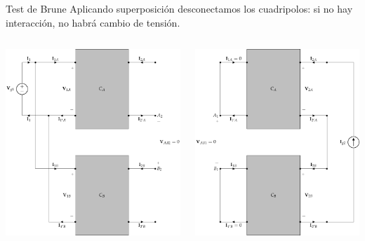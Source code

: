 \documentclass[xcolor={usenames,svgnames,dvipsnames}]{beamer}
\begin{document}
\begin{frame}[label={sec:org75273b2},plain]{Test de Brune}
Aplicando superposición desconectamos los cuadripolos: \alert{si no hay interacción, no habrá cambio de tensión}.
\begin{columns}
\begin{column}{0.65\columnwidth}
\begin{center}
\includegraphics[width=.9\linewidth]{figs/paralelo-serie-brune-entrada.pdf}
\end{center}
\end{column}
\begin{column}{0.65\columnwidth}
\begin{center}
\includegraphics[width=.9\linewidth]{figs/paralelo-serie-brune-salida.pdf}

\end{center}
\end{column}
\end{columns}
\end{frame}
\end{document}
